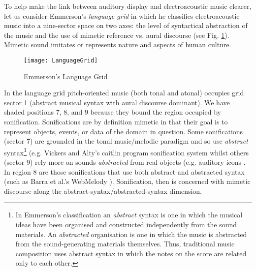 \documentclass[runningheads]{llncs}
\begin{document}
To help make the link between auditory display and electroacoustic music clearer, let us consider Emmerson's \cite{Emmerson:1986} \emph{language grid}  in which he classifies electroacoustic music into a nine-sector space on two axes: the level of syntactical abstraction of the music and the use of mimetic reference vs. aural discourse (see Fig. \ref{fig:grid}). Mimetic sound imitates or represents nature and aspects of human culture.
\begin{figure}[hbt] 
\texttt{[image: LanguageGrid]} 
\caption{Emmerson's Language Grid \cite{Emmerson:1986}} \label{fig:grid} 
\end{figure} 
In the language grid pitch-oriented music (both tonal and atonal) occupies grid sector 1 (abstract musical syntax with aural discourse dominant). We have shaded positions 7, 8, and 9 because they bound the region occupied by sonification. Sonifications are by definition mimetic in that their goal is to represent objects, events, or data of the domain in question. Some sonifications (sector 7) are grounded in the tonal music/melodic paradigm and so use \emph{abstract} syntax\footnote{In Emmerson's classification an \emph{abstract} syntax is one in which the musical ideas have been organised and constructed independently from the sound materials. An \emph{abstracted} organisation is one in which the music is abstracted from the sound-generating materials themselves. Thus, traditional music composition uses abstract syntax in which the notes on the score are related only to each other.}  (e.g. Vickers and Alty's {\sc caitlin} program sonification system \cite{Vickers:2005c} whilst others (sector 9) rely more on sounds \emph{abstracted} from real objects (e.g. auditory icons \cite{Gaver:1986}. In region 8 are those sonifications that use both abstract  and abstracted syntax (such as Barra et al.'s {\sc WebMelody} \cite{Barra:2002}). Sonification, then is concerned with mimetic discourse along the abstract-syntax/abstracted-syntax dimension. 
\end{document}
